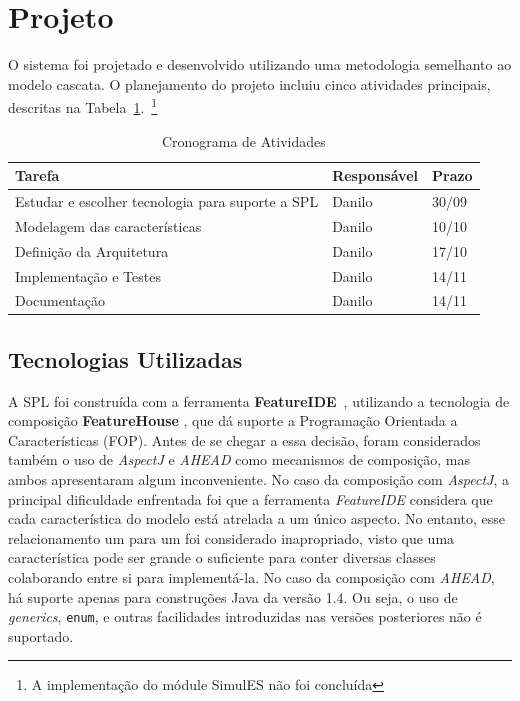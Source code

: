 \documentclass[12pt]{article}
\newcommand{\tra}[1]{\renewcommand{\arraystretch}{#1}}
\begin{document}
\FloatBarrier
\section{Projeto}
\label{sec:design}

O sistema foi projetado e desenvolvido utilizando uma metodologia semelhanto ao modelo cascata. O planejamento do projeto incluiu cinco atividades principais, descritas na Tabela~\ref{tab:activities}.~\footnote{A implementação do módule SimulES não foi concluída}

\begin{table}[htb]\centering
\tra{1.1}
\begin{tabular}{@{}lll@{}}\toprule
\textbf{Tarefa} & \textbf{Responsável} & \textbf{Prazo} \\
\midrule
Estudar e escolher tecnologia para suporte a SPL & Danilo & 30/09 \\
Modelagem das características & Danilo & 10/10 \\
Definição da Arquitetura & Danilo & 17/10 \\
Implementação e Testes & Danilo & 14/11 \\
Documentação & Danilo & 14/11 \\
\bottomrule
\end{tabular}
\caption{Cronograma de Atividades}
\label{tab:activities}
\end{table}


\subsection{Tecnologias Utilizadas}

A SPL foi construída com a ferramenta \textbf{FeatureIDE}~\cite{kastner2009featureide}, utilizando a tecnologia de composição \textbf{FeatureHouse} \cite{apel2009featurehouse}, que dá suporte a Programação Orientada a Características (FOP). %
Antes de se chegar a essa decisão, foram considerados também o uso de \emph{AspectJ} e \emph{AHEAD} como mecanismos de composição, mas ambos apresentaram algum inconveniente. No caso da composição com \emph{AspectJ}, a principal dificuldade enfrentada foi que a ferramenta \emph{FeatureIDE} considera que cada característica do modelo está atrelada a um único aspecto. No entanto, esse relacionamento um para um foi considerado inapropriado, visto que uma característica pode ser grande o suficiente para conter diversas classes colaborando entre si para implementá-la.
No caso da composição com \emph{AHEAD}, há suporte apenas para construções Java da versão 1.4. Ou seja, o uso de \emph{generics}, \texttt{enum}, e outras facilidades introduzidas nas versões posteriores não é suportado.
\end{document}

